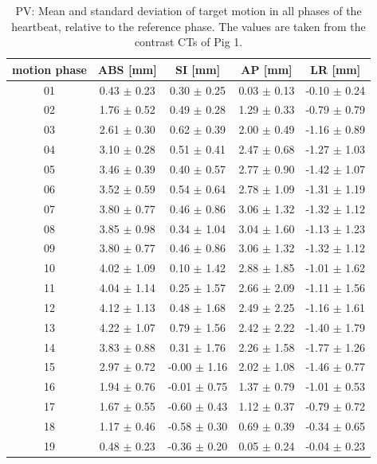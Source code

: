 \documentclass[type=dr, dr=rernat, accentcolor=tud7b,colorbacktitle, bigchapter, openright, twoside, 12pt ]{tudthesis}
\begin{document}
\begin{table}[H]
  \centering
     \tiny 
  \caption{PV: Mean and standard deviation of target motion in all phases of the heartbeat, relative to the reference phase. The values are 
  taken from the contrast CTs of Pig 1.}
  \begin{tabular}{|c|c|c|c|c|}
    \hline\hline
    motion phase\rule{0pt}{2.6ex}\rule[-1.2ex]{0pt}{0pt} & ABS [mm] & SI [mm] & AP [mm] & LR [mm]\\
    \hline
01 &0.43 $\pm$ 0.23 &0.30 $\pm$ 0.25 &0.03 $\pm$ 0.13 &-0.10 $\pm$ 0.24 \\
02 &1.76 $\pm$ 0.52 &0.49 $\pm$ 0.28 &1.29 $\pm$ 0.33 &-0.79 $\pm$ 0.79 \\
03 &2.61 $\pm$ 0.30 &0.62 $\pm$ 0.39 &2.00 $\pm$ 0.49 &-1.16 $\pm$ 0.89 \\
04 &3.10 $\pm$ 0.28 &0.51 $\pm$ 0.41 &2.47 $\pm$ 0.68 &-1.27 $\pm$ 1.03 \\
05 &3.46 $\pm$ 0.39 &0.40 $\pm$ 0.57 &2.77 $\pm$ 0.90 &-1.42 $\pm$ 1.07 \\
06 &3.52 $\pm$ 0.59 &0.54 $\pm$ 0.64 &2.78 $\pm$ 1.09 &-1.31 $\pm$ 1.19 \\
07 &3.80 $\pm$ 0.77 &0.46 $\pm$ 0.86 &3.06 $\pm$ 1.32 &-1.32 $\pm$ 1.12 \\
08 &3.85 $\pm$ 0.98 &0.34 $\pm$ 1.04 &3.04 $\pm$ 1.60 &-1.13 $\pm$ 1.23 \\
09 &3.80 $\pm$ 0.77 &0.46 $\pm$ 0.86 &3.06 $\pm$ 1.32 &-1.32 $\pm$ 1.12 \\
10 &4.02 $\pm$ 1.09 &0.10 $\pm$ 1.42 &2.88 $\pm$ 1.85 &-1.01 $\pm$ 1.62 \\
11 &4.04 $\pm$ 1.14 &0.25 $\pm$ 1.57 &2.66 $\pm$ 2.09 &-1.11 $\pm$ 1.56 \\
12 &4.12 $\pm$ 1.13 &0.48 $\pm$ 1.68 &2.49 $\pm$ 2.25 &-1.16 $\pm$ 1.61 \\
13 &4.22 $\pm$ 1.07 &0.79 $\pm$ 1.56 &2.42 $\pm$ 2.22 &-1.40 $\pm$ 1.79 \\
14 &3.83 $\pm$ 0.88 &0.31 $\pm$ 1.76 &2.26 $\pm$ 1.58 &-1.77 $\pm$ 1.26 \\
15 &2.97 $\pm$ 0.72 &-0.00 $\pm$ 1.16 &2.02 $\pm$ 1.08 &-1.46 $\pm$ 0.77 \\
16 &1.94 $\pm$ 0.76 &-0.01 $\pm$ 0.75 &1.37 $\pm$ 0.79 &-1.01 $\pm$ 0.53 \\
17 &1.67 $\pm$ 0.55 &-0.60 $\pm$ 0.43 &1.12 $\pm$ 0.37 &-0.79 $\pm$ 0.72 \\
18 &1.17 $\pm$ 0.46 &-0.58 $\pm$ 0.30 &0.69 $\pm$ 0.39 &-0.34 $\pm$ 0.65 \\
19 &0.48 $\pm$ 0.23 &-0.36 $\pm$ 0.20 &0.05 $\pm$ 0.24 &-0.04 $\pm$ 0.23 \\
    \hline\hline
  \end{tabular}
  \label{tab:motion:PV:Pig1}
\end{table}
\end{document}
